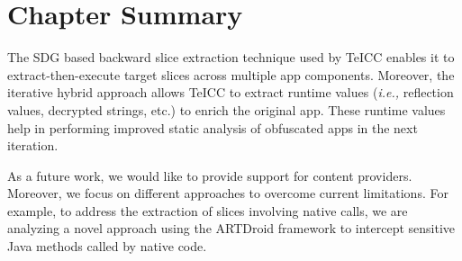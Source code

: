 \section{Chapter Summary}
\label{sec:conclusion}
The SDG based backward slice extraction technique used by TeICC enables it to extract-then-execute target slices across multiple app components. Moreover, the iterative hybrid approach allows TeICC to extract runtime values (\textit{i.e.,} reflection values, decrypted strings, etc.) to enrich the original app. These runtime values help in performing improved static analysis of obfuscated apps in the next iteration. 

As a future work, we would like to provide support for content providers. Moreover, we focus on different approaches to overcome current limitations. For example, to address the extraction of slices involving native calls, we are analyzing a novel approach using the ARTDroid \cite{costamagnaartdroid} framework to intercept sensitive Java methods called by native code.